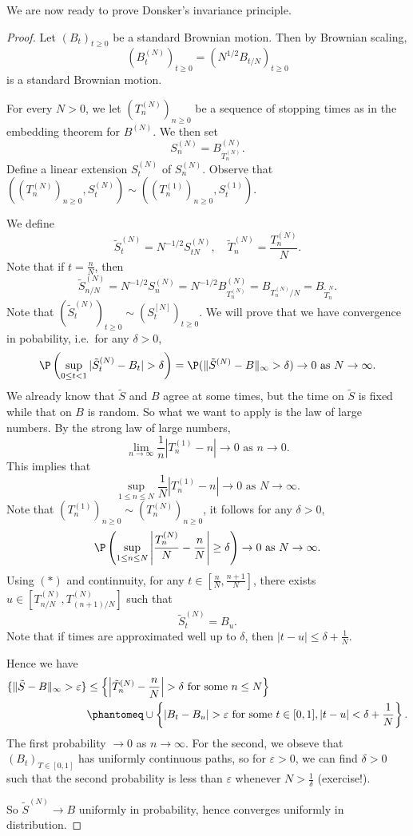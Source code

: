 \documentclass[a4paper]{article}
\begin{document}
We are now ready to prove Donsker's invariance principle.

\begin{proof}
  Let $(B_t)_{t \geq 0}$ be a standard Brownian motion. Then by Brownian scaling,
  \[
    (B_t^{(N)})_{t \geq 0} = (N^{1/2} B_{t/N})_{t \geq 0}
  \]
  is a standard Brownian motion.

  For every $N > 0$, we let $(T_n^{(N)})_{n \geq 0}$ be a sequence of stopping times as in the embedding theorem for $B^{(N)}$. We then set
  \[
    S_n^{(N)} = B_{T_n^{(N)}}^{(N)}.
  \]
  Define a linear extension $S_t^{(N)}$ of $S_n^{(N)}$. Observe that $((T_n^{(N)})_{n \geq 0}, S_t^{(N)}) \sim ((T_n^{(1)})_{n \geq 0}, S_t^{(1)})$.

  We define
  \[
    \tilde{S}_t^{(N)} = N^{-1/2} S_{tN}^{(N)},\quad \tilde{T}_n^{(N)} = \frac{T_n^{(N)}}{N}.
  \]
  Note that if $t = \frac{n}{N}$, then
  \[
    \tilde{S}^{(N)}_{n/N} = N^{-1/2} S_n^{(N)} = N^{-1/2} B_{T_n^{(N)}}^{(N)} = B_{T_n^{(N)}/N} = B_{\tilde{T}^N_n}.\tag{$*$}
  \]
  Note that $(\tilde{S}_t^{(N)})_{t \geq 0} \sim (S_t^{[N]})_{t \geq 0}$. We will prove that we have convergence in pobability, i.e.\ for any $\delta > 0$, 
  \[
    \P\left(\sup_{0\leq t < 1} |\tilde{S}_t^{(N)} - B_t| > \delta \right) = \P(\|\tilde{S}^{(N)} - B\|_\infty > \delta) \to 0 \text{ as }N \to \infty.
  \]
  We already know that $\tilde{S}$ and $B$ agree at some times, but the time on $\tilde{S}$ is fixed while that on $B$ is random. So what we want to apply is the law of large numbers. By the strong law of large numbers,
  \[
    \lim_{n \to \infty} \frac{1}{n} |T_n^{(1)} - n| \to 0\text{ as } n \to 0.
  \]
  This implies that
  \[
    \sup_{1 \leq n \leq N} \frac{1}{N} |T_n^{(1)} - n| \to 0\text{ as }N \to \infty.
  \]
  Note that $(T_n^{(1)})_{n \geq 0} \sim (T_n^{(N)})_{n \geq 0}$, it follows for any $\delta > 0$,
  \[
    \P\left(\sup_{1 \leq n \leq N} \left|\frac{T_n^{(N)}}{N} - \frac{n}{N} \right| \geq \delta\right) \to 0\text{ as }N \to \infty.
  \]
  Using $(*)$ and continnuity, for any $t \in [\frac{n}{N}, \frac{n + 1}{N}]$, there exists $u \in [T^{(N)}_{n/N}, T^{(N)}_{(n+1)/N}]$ such that
  \[
    \tilde{S}^{(N)}_t = B_u.
  \]
  Note that if times are approximated well up to $\delta$, then $|t - u| \leq \delta + \frac{1}{N}$.

  Hence we have
  \begin{align*}
    \{\|\tilde{S} - B\|_{\infty} > \varepsilon\} &\leq \left\{ \left|\tilde{T}_n^{(N)} - \frac{n}{N}\right| > \delta\text{ for some }n \leq N\right\} \\
    &\phantomeq \cup  \left\{|B_t - B_u| > \varepsilon \text{ for some }t \in [0, 1], |t - u| < \delta + \frac{1}{N}\right\}.
  \end{align*}
  The first probability $ \to 0$ as $n \to \infty$. For the second, we obseve that $(B_t)_{T \in [0, 1]}$ has uniformly continuous paths, so for $\varepsilon > 0$, we can find $\delta > 0$ such that the second probability is less than $\varepsilon$ whenever $N > \frac{1}{\delta}$ (exercise!).

  So $\tilde{S}^{(N)} \to B$ uniformly in probability, hence converges uniformly in distribution.
\end{proof}
\end{document}
